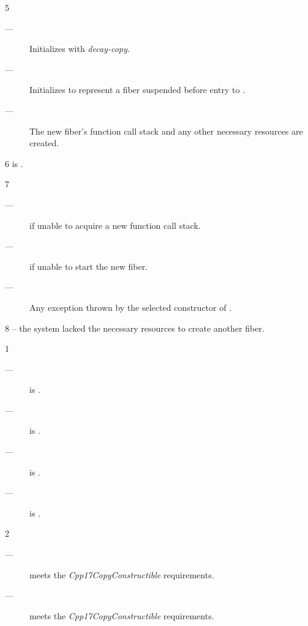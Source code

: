 5 \effects
\begin{description}
    \item[---] Initializes  with \emph{decay-copy}.
    \item[---] Initializes  to represent a fiber suspended before
              entry to .
    \item[---] The new fiber's function call stack and any other necessary
              resources are created.
\end{description}

6 \postcond
\emptyfn is \false.

7 \except
\begin{description}
    \item[---]  if unable to acquire a new function call stack.
    \item[---]  if unable to start the new fiber.
    \item[---] Any exception thrown by the selected constructor of .
\end{description}

8 \errors
{} -- the system lacked the necessary resources to create another fiber.


1 \mandates
\begin{description}
    \item[---]  is \true.
    \item[---]  is \true.
    \item[---]  is \true.
    \item[---]  is \true.
\end{description}

2 \precond
\begin{description}
    \item[---]  meets the \emph{Cpp17CopyConstructible} requirements.
    \item[---]  meets the \emph{Cpp17CopyConstructible} requirements.
\end{description}

